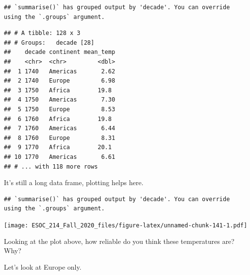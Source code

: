 \documentclass[
]{book}
\newenvironment{Shaded}{\begin{snugshade}}{\end{snugshade}}
\newcommand{\DataTypeTok}[1]{\textcolor[rgb]{0.13,0.29,0.53}{#1}}
\newcommand{\KeywordTok}[1]{\textcolor[rgb]{0.13,0.29,0.53}{\textbf{#1}}}
\newcommand{\NormalTok}[1]{#1}
\newcommand{\OperatorTok}[1]{\textcolor[rgb]{0.81,0.36,0.00}{\textbf{#1}}}
\newcommand{\OtherTok}[1]{\textcolor[rgb]{0.56,0.35,0.01}{#1}}
\newcommand{\StringTok}[1]{\textcolor[rgb]{0.31,0.60,0.02}{#1}}
\begin{document}
\begin{verbatim}
## `summarise()` has grouped output by 'decade'. You can override using the `.groups` argument.
\end{verbatim}

\begin{verbatim}
## # A tibble: 128 x 3
## # Groups:   decade [28]
##    decade continent mean_temp
##    <chr>  <chr>         <dbl>
##  1 1740   Americas       2.62
##  2 1740   Europe         6.98
##  3 1750   Africa        19.8 
##  4 1750   Americas       7.30
##  5 1750   Europe         8.53
##  6 1760   Africa        19.8 
##  7 1760   Americas       6.44
##  8 1760   Europe         8.31
##  9 1770   Africa        20.1 
## 10 1770   Americas       6.61
## # ... with 118 more rows
\end{verbatim}

It's still a long data frame, plotting helps here.

\begin{Shaded}
\end{Shaded}

\begin{verbatim}
## `summarise()` has grouped output by 'decade'. You can override using the `.groups` argument.
\end{verbatim}

\texttt{[image: ESOC\_214\_Fall\_2020\_files/figure-latex/unnamed-chunk-141-1.pdf]}

Looking at the plot above, how reliable do you think these temperatures are? Why?

Let's look at Europe only.

\begin{Shaded}
\end{Shaded}
\end{document}
